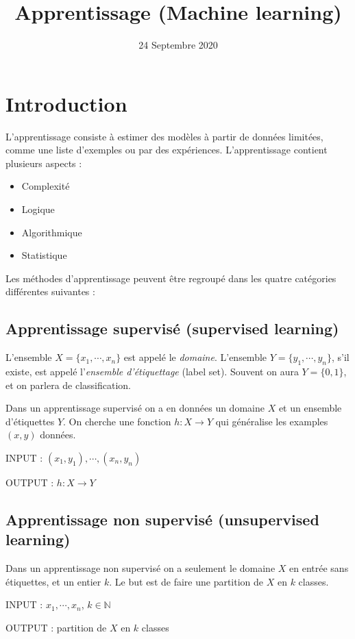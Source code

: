 \documentclass{article}
\title{Apprentissage (Machine learning)}
\date{24 Septembre 2020}
\theoremstyle{plain}
\theoremstyle{remark}
\theoremstyle{definition}
\begin{document}
\maketitle

\section{Introduction}

L'apprentissage consiste à estimer des modèles à partir de données limitées, comme une liste d'exemples ou par des expériences. 
L'apprentissage contient plusieurs aspects :
\begin{itemize}
    \item Complexité
    \item Logique
    \item Algorithmique
    \item Statistique
\end{itemize}
Les méthodes d'apprentissage peuvent être regroupé dans les quatre catégories différentes suivantes :

\subsection{Apprentissage supervisé (supervised learning)}

L'ensemble $X=\{x_1,\cdots ,x_n\}$ est appelé le \emph{domaine}. L'ensemble $Y=\{y_1, \cdots , y_n \}$, s'il existe, est appelé l'\emph{ensemble d'étiquettage} (label set). Souvent on aura $Y=\{0,1\}$, et on parlera de classification.

Dans un apprentissage supervisé on a en données un domaine $X$ et un ensemble d'étiquettes $Y$. On cherche une fonction $h : X \rightarrow Y$ qui généralise les examples $(x,y)$ données.

INPUT : $(x_1,y_1),\cdots, (x_n, y_n)$

OUTPUT : $h : X\rightarrow Y$

\subsection{Apprentissage non supervisé (unsupervised learning)}

Dans un apprentissage non supervisé on a seulement le domaine $X$ en entrée sans étiquettes, et un entier $k$. Le but est de faire une partition de $X$ en $k$ classes.

INPUT : $x_1, \cdots , x_n$, $k\in \mathbb{N}$

OUTPUT : partition de $X$ en $k$ classes
\end{document}
